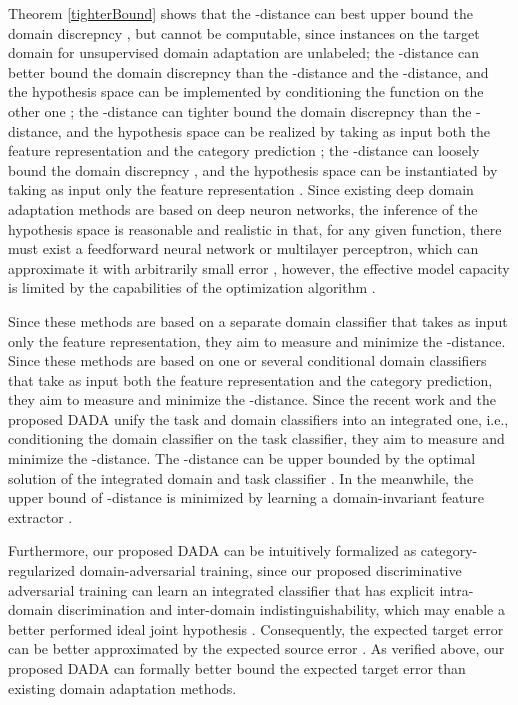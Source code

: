 \documentclass[letterpaper]{article} \usepackage{aaai20}  \usepackage{times}  \usepackage{helvet} \usepackage{courier}  \usepackage[hyphens]{url}  \usepackage{graphicx} \urlstyle{rm} \def\UrlFont{\rm}  \usepackage{graphicx}  \frenchspacing  \setlength{\pdfpagewidth}{8.5in}  \setlength{\pdfpageheight}{11in}
\begin{document}
Theorem \ref{tighterBound} shows that the -distance can best upper bound the domain discrepncy , but cannot be computable, since instances on the target domain for unsupervised domain adaptation are unlabeled; the -distance can better bound the domain discrepncy  than the -distance and the -distance, and the hypothesis space  can be implemented by conditioning the function  on the other one ; the -distance can tighter bound the domain discrepncy  than the -distance, and the hypothesis space  can be realized by taking as input both the feature representation  and the category prediction ; the -distance can loosely bound the domain discrepncy , and the hypothesis space  can be instantiated by taking as input only the feature representation . Since existing deep domain adaptation methods are based on deep neuron networks, the inference of the hypothesis space  is reasonable and realistic in that, for any given function, there must exist a feedforward neural network or multilayer perceptron, which can approximate it with arbitrarily small error \cite{univAppTheo1,univAppTheo2}, however, the effective model capacity is limited by the capabilities of the optimization algorithm \cite{dlbook}. 

Since these methods \cite{dann,adda,SimNet,iCAN,dirt_t} are based on a separate domain classifier that takes as input only the feature representation, they aim to measure and minimize the -distance. Since these methods \cite{mada,cdan,tada,hla} are based on one or several conditional domain classifiers that take as input both the feature representation and the category prediction, they aim to measure and minimize the -distance. Since the recent work \cite{dann_ca} and the proposed DADA unify the task and domain classifiers into an integrated one, i.e., conditioning the domain classifier on the task classifier, they aim to measure and minimize the -distance. The -distance can be upper bounded by the optimal solution of the integrated domain and task classifier . 
In the meanwhile, the upper bound of -distance is minimized by learning a domain-invariant feature extractor . 

Furthermore, our proposed DADA can be intuitively formalized as category-regularized domain-adversarial training, since our proposed discriminative adversarial training can learn an integrated classifier  that has explicit intra-domain discrimination and inter-domain indistinguishability, which may enable a better performed ideal joint hypothesis . Consequently, the expected target error  can be better approximated by the expected source error . As verified above, our proposed DADA can formally better bound the expected target error than existing domain adaptation methods.
\end{document}

